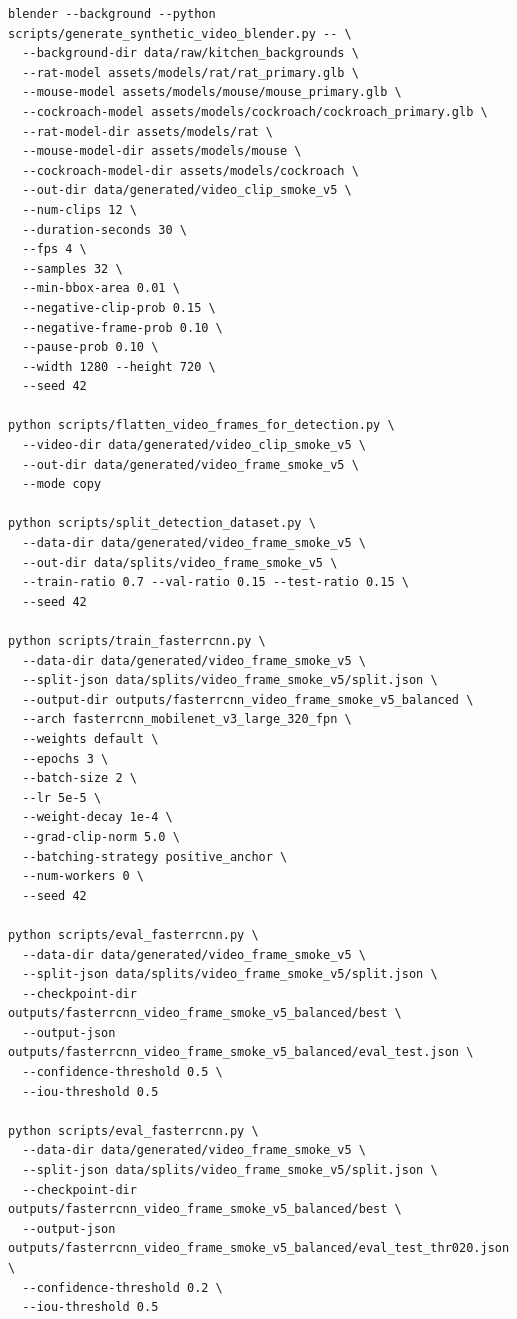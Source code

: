 \documentclass[11pt]{article}
\begin{document}
\begin{verbatim}
blender --background --python scripts/generate_synthetic_video_blender.py -- \
  --background-dir data/raw/kitchen_backgrounds \
  --rat-model assets/models/rat/rat_primary.glb \
  --mouse-model assets/models/mouse/mouse_primary.glb \
  --cockroach-model assets/models/cockroach/cockroach_primary.glb \
  --rat-model-dir assets/models/rat \
  --mouse-model-dir assets/models/mouse \
  --cockroach-model-dir assets/models/cockroach \
  --out-dir data/generated/video_clip_smoke_v5 \
  --num-clips 12 \
  --duration-seconds 30 \
  --fps 4 \
  --samples 32 \
  --min-bbox-area 0.01 \
  --negative-clip-prob 0.15 \
  --negative-frame-prob 0.10 \
  --pause-prob 0.10 \
  --width 1280 --height 720 \
  --seed 42

python scripts/flatten_video_frames_for_detection.py \
  --video-dir data/generated/video_clip_smoke_v5 \
  --out-dir data/generated/video_frame_smoke_v5 \
  --mode copy

python scripts/split_detection_dataset.py \
  --data-dir data/generated/video_frame_smoke_v5 \
  --out-dir data/splits/video_frame_smoke_v5 \
  --train-ratio 0.7 --val-ratio 0.15 --test-ratio 0.15 \
  --seed 42

python scripts/train_fasterrcnn.py \
  --data-dir data/generated/video_frame_smoke_v5 \
  --split-json data/splits/video_frame_smoke_v5/split.json \
  --output-dir outputs/fasterrcnn_video_frame_smoke_v5_balanced \
  --arch fasterrcnn_mobilenet_v3_large_320_fpn \
  --weights default \
  --epochs 3 \
  --batch-size 2 \
  --lr 5e-5 \
  --weight-decay 1e-4 \
  --grad-clip-norm 5.0 \
  --batching-strategy positive_anchor \
  --num-workers 0 \
  --seed 42

python scripts/eval_fasterrcnn.py \
  --data-dir data/generated/video_frame_smoke_v5 \
  --split-json data/splits/video_frame_smoke_v5/split.json \
  --checkpoint-dir outputs/fasterrcnn_video_frame_smoke_v5_balanced/best \
  --output-json outputs/fasterrcnn_video_frame_smoke_v5_balanced/eval_test.json \
  --confidence-threshold 0.5 \
  --iou-threshold 0.5

python scripts/eval_fasterrcnn.py \
  --data-dir data/generated/video_frame_smoke_v5 \
  --split-json data/splits/video_frame_smoke_v5/split.json \
  --checkpoint-dir outputs/fasterrcnn_video_frame_smoke_v5_balanced/best \
  --output-json outputs/fasterrcnn_video_frame_smoke_v5_balanced/eval_test_thr020.json \
  --confidence-threshold 0.2 \
  --iou-threshold 0.5
\end{verbatim}
\end{document}
